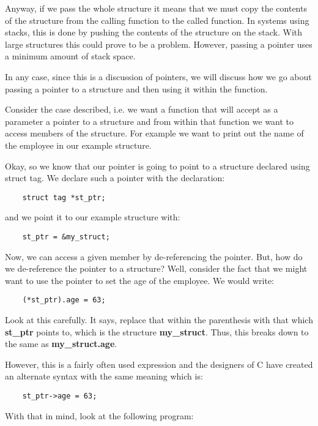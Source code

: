Anyway, if we pass the whole structure it means that we must copy the
contents of the structure from the calling function to the called
function. In systems using stacks, this is done by pushing the contents
of the structure on the stack. With large structures this could prove to
be a problem. However, passing a pointer uses a minimum amount of stack
space.

In any case, since this is a discussion of pointers, we will discuss how
we go about passing a pointer to a structure and then using it within
the function.

Consider the case described, i.e. we want a function that will accept as
a parameter a pointer to a structure and from within that function we
want to access members of the structure. For example we want to print
out the name of the employee in our example structure.

Okay, so we know that our pointer is going to point to a structure
declared using struct tag. We declare such a pointer with the
declaration:

\begin{verbatim}
    struct tag *st_ptr;
\end{verbatim}

and we point it to our example structure with:

\begin{verbatim}
    st_ptr = &my_struct;
\end{verbatim}

Now, we can access a given member by de-referencing the pointer. But,
how do we de-reference the pointer to a structure? Well, consider the
fact that we might want to use the pointer to set the age of the
employee. We would write:

\begin{verbatim}
    (*st_ptr).age = 63;
\end{verbatim}

Look at this carefully. It says, replace that within the parenthesis
with that which \textbf{st\_ptr} points to, which is the structure
\textbf{my\_struct}. Thus, this breaks down to the same as
\textbf{my\_struct.age}.

However, this is a fairly often used expression and the designers of C
have created an alternate syntax with the same meaning which is:

\begin{verbatim}
    st_ptr->age = 63;
\end{verbatim}

With that in mind, look at the following program:


